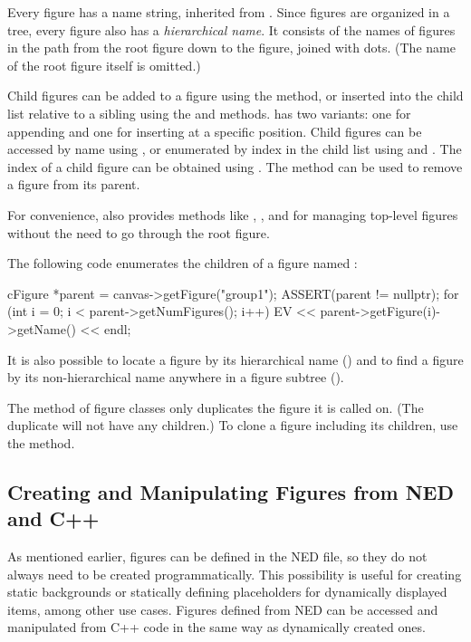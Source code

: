 Every figure has a name string, inherited from . Since
figures are organized in a tree, every figure also has a \textit{hierarchical
name}. It consists of the names of figures in the path from the root figure down
to the figure, joined with dots. (The name of the root figure itself is
omitted.)

Child figures can be added to a figure using the  method, or
inserted into the child list relative to a sibling using the
 and  methods. 
has two variants: one for appending and one for inserting at a specific
position. Child figures can be accessed by name using ,
or enumerated by index in the child list using  and
. The index of a child figure can be obtained using
. The  method can be used to
remove a figure from its parent.

For convenience,  also provides methods like
, , and  for
managing top-level figures without the need to go through the root figure.

The following code enumerates the children of a figure named :

\begin{cpp}
cFigure *parent = canvas->getFigure("group1");
ASSERT(parent != nullptr);
for (int i = 0; i < parent->getNumFigures(); i++)
    EV << parent->getFigure(i)->getName() << endl;
\end{cpp}

It is also possible to locate a figure by its hierarchical name
() and to find a figure by its non-hierarchical name
anywhere in a figure subtree ().

The  method of figure classes only duplicates the figure it is
called on. (The duplicate will not have any children.) To clone a figure
including its children, use the  method.


\subsection{Creating and Manipulating Figures from NED and C++}
\label{sec:graphics:creating-and-manipulating-figures}

As mentioned earlier, figures can be defined in the NED file, so they do not
always need to be created programmatically. This possibility is useful for
creating static backgrounds or statically defining placeholders for dynamically
displayed items, among other use cases. Figures defined from NED can be accessed
and manipulated from C++ code in the same way as dynamically created ones.

